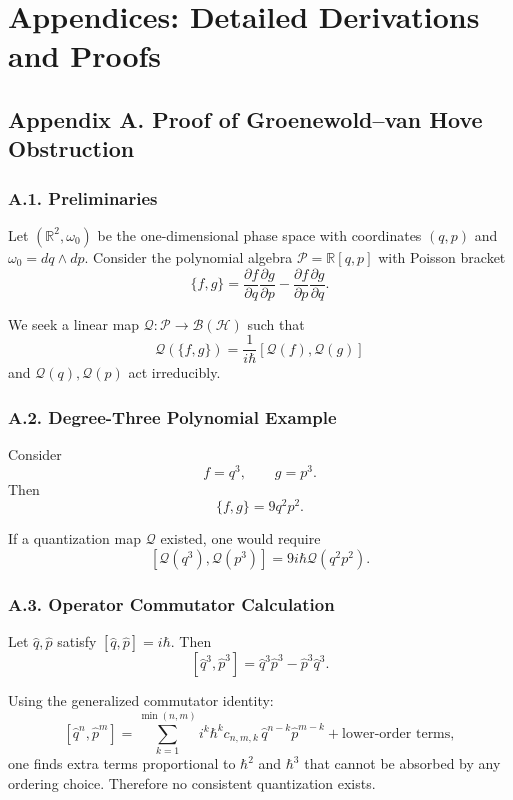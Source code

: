 \documentclass[12pt,oneside]{book}
\theoremstyle{plain}
\theoremstyle{definition}
\begin{document}
\appendix

\chapter{Appendices: Detailed Derivations and Proofs}

\section{Appendix A. Proof of Groenewold–van Hove Obstruction}

\subsection*{A.1. Preliminaries}

Let $(\mathbb{R}^{2},\omega_0)$ be the one-dimensional phase space with coordinates $(q,p)$ and $\omega_0 = dq \wedge dp$. Consider the polynomial algebra $\mathcal{P} = \mathbb{R}[q,p]$ with Poisson bracket
\[
\{f,g\} = \frac{\partial f}{\partial q} \frac{\partial g}{\partial p} - \frac{\partial f}{\partial p} \frac{\partial g}{\partial q}.
\]

We seek a linear map $\mathcal{Q}:\mathcal{P}\to \mathcal{B}(\mathcal{H})$ such that
\[
\mathcal{Q}(\{f,g\}) = \frac{1}{i\hbar}[\mathcal{Q}(f), \mathcal{Q}(g)]
\]
and $\mathcal{Q}(q),\mathcal{Q}(p)$ act irreducibly.

\subsection*{A.2. Degree-Three Polynomial Example}

Consider
\[
f = q^3, \qquad g = p^3.
\]
Then
\[
\{f,g\} = 9 q^2 p^2.
\]

If a quantization map $\mathcal{Q}$ existed, one would require
\[
[\mathcal{Q}(q^3), \mathcal{Q}(p^3)] = 9 i \hbar \mathcal{Q}(q^2 p^2).
\]

\subsection*{A.3. Operator Commutator Calculation}

Let $\widehat{q}, \widehat{p}$ satisfy $[\widehat{q},\widehat{p}] = i \hbar$. Then
\[
[\widehat{q}^3, \widehat{p}^3] = \widehat{q}^3 \widehat{p}^3 - \widehat{p}^3 \widehat{q}^3.
\]

Using the generalized commutator identity:
\[
[\widehat{q}^n, \widehat{p}^m] = \sum_{k=1}^{\min(n,m)} i^k \hbar^k c_{n,m,k} \, \widehat{q}^{n-k} \widehat{p}^{m-k} + \text{lower-order terms},
\]
one finds extra terms proportional to $\hbar^2$ and $\hbar^3$ that cannot be absorbed by any ordering choice. Therefore no consistent quantization exists.
\end{document}
